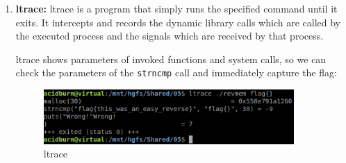 \documentclass{article}
\begin{document}
\begin{enumerate}
\item{\textbf{ltrace:}}
ltrace is a program that simply runs the specified command until it exits.  It intercepts and records the 
dynamic library calls which are called by the executed process and the signals which are received by that process.

\noindent\linebreak
ltrace shows parameters of invoked functions and system calls, so we can check the parameters of the 
\texttt{strncmp} call and immediately capture the flag:
\begin{figure}[H]
\centering
\includegraphics[width=0.9\textwidth]{img/ltrace.jpg}
\caption{ltrace}
\label{fig:ltrace}
\end{figure}
\end{enumerate}

\pagebreak



\end{document}
